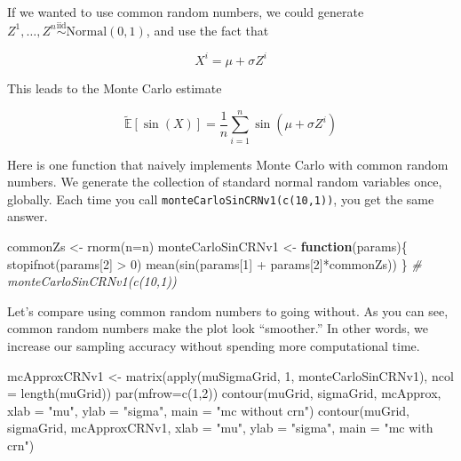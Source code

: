 \documentclass[
  12pt,
  krantz2]{krantz}
\makeatletter
\newenvironment{Shaded}{\begin{snugshade}}{\end{snugshade}}
\newcommand{\AttributeTok}[1]{\textcolor[rgb]{0.61,0.61,0.61}{#1}}
\newcommand{\CommentTok}[1]{\textcolor[rgb]{0.37,0.37,0.37}{\textit{#1}}}
\newcommand{\ControlFlowTok}[1]{\textcolor[rgb]{0.27,0.27,0.27}{\textbf{#1}}}
\newcommand{\DecValTok}[1]{\textcolor[rgb]{0.06,0.06,0.06}{#1}}
\newcommand{\FunctionTok}[1]{\textcolor[rgb]{0,0,0}{#1}}
\newcommand{\NormalTok}[1]{#1}
\newcommand{\OtherTok}[1]{\textcolor[rgb]{0.37,0.37,0.37}{#1}}
\newcommand{\SpecialCharTok}[1]{\textcolor[rgb]{0,0,0}{#1}}
\newcommand{\StringTok}[1]{\textcolor[rgb]{0.5,0.5,0.5}{#1}}
\newenvironment{kframe}{%
\medskip{}
\setlength{\fboxsep}{.8em}
 \def\at@end@of@kframe{}%
 \ifinner\ifhmode%
  \def\at@end@of@kframe{\end{minipage}}%
  \begin{minipage}{\columnwidth}%
 \fi\fi%
 \def\FrameCommand##1{\hskip\@totalleftmargin \hskip-\fboxsep
 \colorbox{shadecolor}{##1}\hskip-\fboxsep
     \hskip-\linewidth \hskip-\@totalleftmargin \hskip\columnwidth}%
 \MakeFramed {\advance\hsize-\width
   \@totalleftmargin\z@ \linewidth\hsize
   \@setminipage}}%
 {\par\unskip\endMakeFramed%
 \at@end@of@kframe}
\renewenvironment{Shaded}{\begin{kframe}}{\end{kframe}}
\makeatother
\begin{document}
If we wanted to use common random numbers, we could generate \(Z^1, \ldots, Z^n \overset{\text{iid}}{\sim} \text{Normal}(0, 1)\), and use the fact that

\begin{equation} 
X^i = \mu + \sigma Z^i
\end{equation}

This leads to the Monte Carlo estimate

\begin{equation} 
\tilde{\mathbb{E}}[\sin(X)] = \frac{1}{n}\sum_{i=1}^n\sin(\mu + \sigma Z^i)
\end{equation}

Here is one function that naively implements Monte Carlo with common random numbers. We generate the collection of standard normal random variables once, globally. Each time you call \texttt{monteCarloSinCRNv1(c(10,1))}, you get the same answer.

\begin{Shaded}
\begin{Highlighting}[]
\NormalTok{commonZs }\OtherTok{\textless{}{-}} \FunctionTok{rnorm}\NormalTok{(}\AttributeTok{n=}\NormalTok{n)}
\NormalTok{monteCarloSinCRNv1 }\OtherTok{\textless{}{-}} \ControlFlowTok{function}\NormalTok{(params)\{}
  \FunctionTok{stopifnot}\NormalTok{(params[}\DecValTok{2}\NormalTok{] }\SpecialCharTok{\textgreater{}} \DecValTok{0}\NormalTok{) }
  \FunctionTok{mean}\NormalTok{(}\FunctionTok{sin}\NormalTok{(params[}\DecValTok{1}\NormalTok{] }\SpecialCharTok{+}\NormalTok{ params[}\DecValTok{2}\NormalTok{]}\SpecialCharTok{*}\NormalTok{commonZs))}
\NormalTok{\} }
\CommentTok{\# monteCarloSinCRNv1(c(10,1))}
\end{Highlighting}
\end{Shaded}

Let's compare using common random numbers to going without. As you can see, common random numbers make the plot look ``smoother.'' In other words, we increase our sampling accuracy without spending more computational time.

\begin{Shaded}
\begin{Highlighting}[]
\NormalTok{mcApproxCRNv1 }\OtherTok{\textless{}{-}} \FunctionTok{matrix}\NormalTok{(}\FunctionTok{apply}\NormalTok{(muSigmaGrid, }\DecValTok{1}\NormalTok{, monteCarloSinCRNv1), }
                        \AttributeTok{ncol =} \FunctionTok{length}\NormalTok{(muGrid))}
\FunctionTok{par}\NormalTok{(}\AttributeTok{mfrow=}\FunctionTok{c}\NormalTok{(}\DecValTok{1}\NormalTok{,}\DecValTok{2}\NormalTok{))}
\FunctionTok{contour}\NormalTok{(muGrid, sigmaGrid, mcApprox, }
        \AttributeTok{xlab =} \StringTok{"mu"}\NormalTok{, }\AttributeTok{ylab =} \StringTok{"sigma"}\NormalTok{, }\AttributeTok{main =} \StringTok{"mc without crn"}\NormalTok{)}
\FunctionTok{contour}\NormalTok{(muGrid, sigmaGrid, mcApproxCRNv1, }
        \AttributeTok{xlab =} \StringTok{"mu"}\NormalTok{, }\AttributeTok{ylab =} \StringTok{"sigma"}\NormalTok{, }\AttributeTok{main =} \StringTok{"mc with crn"}\NormalTok{)}
\end{Highlighting}
\end{Shaded}
\end{document}
